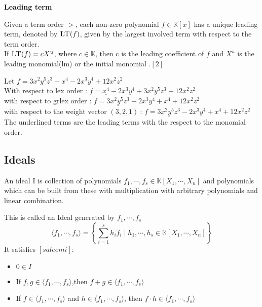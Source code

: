 \textbf{Leading term}

Given a term order $>$, each non-zero polynomial $f \in \mathbb{K}\left[ x\right] $ has a unique leading term, denoted by $\textsc{LT}(f)$, given by the largest involved term with respect to the term order.\\
If $\textsc{LT}(f) = cX^{u}$, where $c \in \mathbb{K}$, then c is the leading coefficient of $f$ and $X^{u}$ is the leading monomial(lm) or the initial monomial .$\left[ 2\right]$\\

\begin{env_example}
\normalfont Let $ f = 3x^{2}y^{5}z^{3} + x^{4} -2x^{3}y^{4} + 12x^{2}z^{2}$ \\
With respect to lex order : $f = \underline{x^{4}} -2x^{3}y^{4} + 3x^{2}y^{5}z^{3} + 12x^{2}z^{2} $ \\
with respect to grlex order : $f = \underline{3x^{2}y^{5}z^{3}} -2x^{3}y^{4} + x^{4}+ 12x^{2}z^{2}$  \\
with respect to the weight vector $\left(3,2,1\right)~$: $f = \underline{3x^{2}y^{5}z^{3}} -2x^{3}y^{4} + x^{4}+ 12x^{2}z^{2}$  \\ 
The underlined terms are the leading terms with the respect to the monomial order.

\end{env_example}


\subsection{Ideals}
\label{subsec:Ideals}

\begin{env_definition}[Ideal]
\cite{KHZ}
An ideal I is collection of polynomials $f_{1}, \cdots , f_{s} \in \mathbb{K}\left[X_{1}, \cdots, X_{n}\right] $ and polynomials which can be built from these with multiplication with arbitrary polynomials and linear combination.

\end{env_definition}
This is called an Ideal generated by $f_{1}, \cdots , f_{s}$ \\
\[ \langle f_{1}, \cdots , f_{s} \rangle = \left\lbrace  \sum_{i=1}^s h_{i}f_{i} \mid h_{1}, \cdots , h_{s} \in \mathbb{K}\left[X_{1}, \cdots, X_{n}\right] \right\rbrace \]
It satisfies $[saleemi] $:
\begin{center}

\begin{itemize}
\item
$0 \in I$ 
\item
If $f,g \in \langle f_{1}, \cdots , f_{s} \rangle$,then  $f+g \in \langle f_{1}, \cdots , f_{s} \rangle$ 
\item
If $f \in \langle f_{1}, \cdots , f_{s} \rangle$ and $h \in  \langle f_{1}, \cdots , f_{s} \rangle$, then $f \cdot h \in \langle f_{1}, \cdots , f_{s} \rangle$
\end{itemize}

\end{center}

